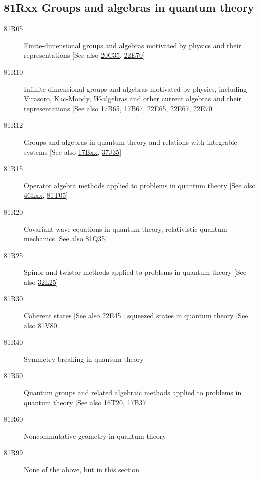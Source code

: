 \documentclass[letterpaper]{article}
\begin{document}
\subsection*{81Rxx  Groups and algebras in quantum theory }\label{81Rxx}
\begin{description}  
\item [81R05]\label{81R05} Finite-dimensional groups and algebras motivated by physics and their representations [See also \hyperref[20C35]{20C35}, \hyperref[22E70]{22E70}]
\item [81R10]\label{81R10} Infinite-dimensional groups and algebras motivated by physics, including Virasoro, Kac-Moody, $W$-algebras and other current algebras and their representations [See also \hyperref[17B65]{17B65}, \hyperref[17B67]{17B67}, \hyperref[22E65]{22E65}, \hyperref[22E67]{22E67}, \hyperref[22E70]{22E70}]
\item [81R12]\label{81R12} Groups and algebras in quantum theory and relations with integrable systems [See also \hyperref[17Bxx]{17Bxx}, \hyperref[37J35]{37J35}]
\item [81R15]\label{81R15} Operator algebra methods applied to problems in quantum theory [See also \hyperref[46Lxx]{46Lxx}, \hyperref[81T05]{81T05}]
\item [81R20]\label{81R20} Covariant wave equations in quantum theory, relativistic quantum mechanics [See also \hyperref[81Q35]{81Q35}]
\item [81R25]\label{81R25} Spinor and twistor methods applied to problems in quantum theory [See also \hyperref[32L25]{32L25}]
\item [81R30]\label{81R30} Coherent states [See also \hyperref[22E45]{22E45}]; squeezed states in quantum theory [See also \hyperref[81V80]{81V80}]
\item [81R40]\label{81R40} Symmetry breaking in quantum theory
\item [81R50]\label{81R50} Quantum groups and related algebraic methods applied to problems in quantum theory [See also \hyperref[16T20]{16T20}, \hyperref[17B37]{17B37}]
\item [81R60]\label{81R60} Noncommutative geometry in quantum theory
\item [81R99]\label{81R99} None of the above, but in this section
\end{description}
\end{document}
